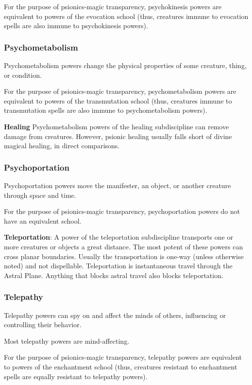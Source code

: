 For the purpose of psionics-magic transparency, psychokinesis powers are equivalent to powers of the evocation school (thus, creatures immune to evocation spells are also immune to psychokinesis powers).

\subsubsection{Psychometabolism}
Psychometabolism powers change the physical properties of some creature, thing, or condition.

For the purpose of psionics-magic transparency, psychometabolism powers are equivalent to powers of the transmutation school (thus, creatures immune to transmutation spells are also immune to psychometabolism powers).

\textbf{Healing}
Psychometabolism powers of the healing subdiscipline can remove damage from creatures. However, psionic healing usually falls short of divine magical healing, in direct comparisons.

\subsubsection{Psychoportation}
Psychoportation powers move the manifester, an object, or another creature through space and time.

For the purpose of psionics-magic transparency, psychoportation powers do not have an equivalent school.

\textbf{Teleportation}: A power of the teleportation subdiscipline transports one or more creatures or objects a great distance. The most potent of these powers can cross planar boundaries. Usually the transportation is one-way (unless otherwise noted) and not dispellable. Teleportation is instantaneous travel through the Astral Plane. Anything that blocks astral travel also blocks teleportation.

\subsubsection{Telepathy}
Telepathy powers can spy on and affect the minds of others, influencing or controlling their behavior.

Most telepathy powers are mind-affecting.

For the purpose of psionics-magic transparency, telepathy powers are equivalent to powers of the enchantment school (thus, creatures resistant to enchantment spells are equally resistant to telepathy powers).

